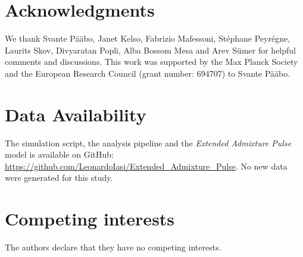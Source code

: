 \documentclass[11pt]{article}
\begin{document}
\section{Acknowledgments}

We thank Svante P\"a\"abo, Janet Kelso, Fabrizio Mafessoni, St\'{e}phane Peyr\'{e}gne, Laurits Skov, Divyaratan Popli, Alba Bossom Mesa and Arev S\"umer for helpful comments and discussions.
This work was supported by the Max Planck Society and the European Research Council (grant number: 694707) to Svante P\"a\"abo.

\section{Data Availability}\label{Data Availability}

The simulation script, the analysis pipeline and the \emph{Extended Admixture Pulse} model is  available  on  GitHub: \url{https://github.com/LeonardoIasi/Extended_Admixture_Pulse}. No new data were generated for this study.

\section{Competing interests}

The authors declare that they have no competing interests.

\hypertarget{refs}{}




\end{document}
